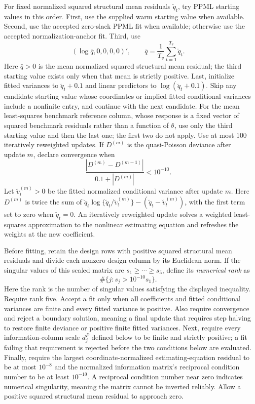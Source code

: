 \documentclass[11pt]{article}
\begin{document}
For fixed normalized squared structural mean residuals \(\breve q_t\), try PPML starting values in this order.
First, use the supplied warm starting value when available. Second, use the accepted zero-slack PPML fit when
available; otherwise use the accepted normalization-anchor fit. Third, use
\begin{equation*}
 \left(\log\bar q,0,0,0,0\right)',
 \qquad \bar q=\frac1{T_v}\sum_{t=1}^{T_v}\breve q_t.
\end{equation*}
Here \(\bar q>0\) is the mean normalized squared structural mean residual; the third starting value
exists only when that mean is strictly positive. Last, initialize fitted
variances to \(\breve q_t+0.1\) and linear predictors to \(\log(\breve q_t+0.1)\). Skip any
candidate starting value whose coordinates or implied fitted conditional variances include a
nonfinite entry, and continue with the next candidate. For the mean
least-squares benchmark reference column, whose response is a fixed vector of squared benchmark
residuals rather than a function of \(\theta\), use only the third starting value and then the last
one; the first two do not apply. Use at most 100
iteratively reweighted updates. If \(D^{(m)}\) is the quasi-Poisson deviance after update \(m\),
declare convergence when
\begin{equation*}
 \frac{|D^{(m)}-D^{(m-1)}|}{0.1+|D^{(m)}|}<10^{-10}.
\end{equation*}
Let \(\breve v_t^{(m)}>0\) be the fitted normalized conditional variance after update \(m\). Here
\(D^{(m)}\) is twice the sum of
\(\breve q_t\log\{\breve q_t/\breve v_t^{(m)}\}-(\breve q_t-\breve v_t^{(m)})\), with the first term
set to zero when \(\breve q_t=0\).
An iteratively reweighted update solves a weighted least-squares approximation to the nonlinear
estimating equation and refreshes the weights at the new coefficient.

Before fitting, retain the design rows with positive squared structural mean residuals and divide
each nonzero design column by its Euclidean norm. If the singular values of this scaled matrix are
\(s_1\ge\cdots\ge s_5\), define its \emph{numerical rank} as
\begin{equation*}
 \#\{j:s_j>10^{-10}s_1\}.
\end{equation*}
Here the rank is the number of singular values satisfying the displayed inequality. Require rank
five. Accept a fit only when all coefficients and fitted conditional variances are finite and every
fitted variance is positive. Also require convergence and reject a boundary solution, meaning a
final update that requires step halving to restore finite deviance or positive finite fitted
variances. Next, require every information-column scale \(d^P_j\) defined below to be finite and
strictly positive; a fit failing that requirement is rejected before the two conditions below are
evaluated. Finally, require the largest
coordinate-normalized estimating-equation residual to be at most \(10^{-8}\) and the normalized
information matrix's reciprocal condition number to be at least \(10^{-10}\). A reciprocal
condition number near zero indicates numerical singularity, meaning the matrix cannot be inverted
reliably. Allow a positive squared structural mean residual to approach zero.
\end{document}
